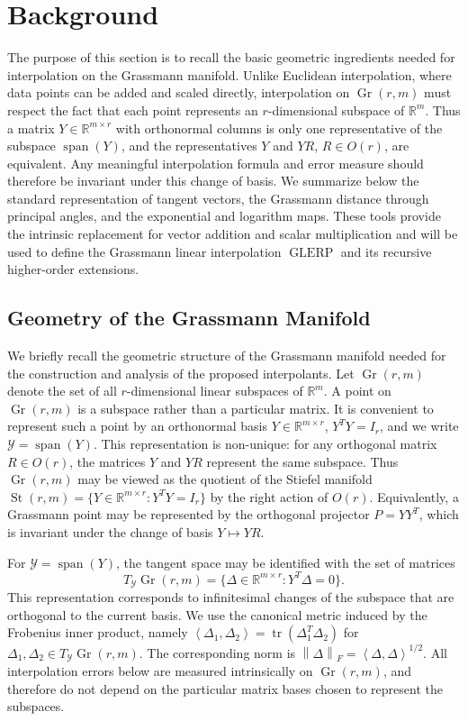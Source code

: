 \documentclass[a4paper,11pt]{article}
\newcommand{\bR}{\mathbb{R}}
\DeclareMathOperator{\Gr}{Gr}
\DeclareMathOperator{\St}{St}
\DeclareMathOperator{\spanop}{span}
\DeclareMathOperator{\tr}{tr}
\newcommand{\cY}{\mathcal{Y}}
\newcommand{\norm}[1]{\left\lVert #1 \right\rVert}
\newcommand{\inner}[2]{\left\langle #1,#2 \right\rangle}
\newcommand{\GLERP}{\operatorname{GLERP}}
\numberwithin{equation}{section}
\theoremstyle{plain}
\theoremstyle{definition}
\theoremstyle{remark}
\begin{document}
\section{Background}\label{sec:background}

The purpose of this section is to recall the basic geometric ingredients needed for interpolation on the Grassmann manifold.  Unlike Euclidean interpolation, where data points can be added and scaled directly, interpolation on \(\Gr(r,m)\) must respect the fact that each point represents an \(r\)-dimensional subspace of \(\bR^m\).  Thus a matrix \(Y\in\bR^{m\times r}\) with orthonormal columns is only one representative of the subspace \(\spanop(Y)\), and the representatives \(Y\) and \(YR\), \(R\in O(r)\), are equivalent.  Any meaningful interpolation formula and error measure should therefore be invariant under this change of basis.  We summarize below the standard representation of tangent vectors, the Grassmann distance through principal angles, and the exponential and logarithm maps.  These tools provide the intrinsic replacement for vector addition and scalar multiplication and will be used to define the Grassmann linear interpolation \(\GLERP\) and its recursive higher-order extensions.

\subsection{Geometry of the Grassmann Manifold}\label{sec:grassmann}

We briefly recall the geometric structure of the Grassmann manifold needed for the construction and analysis of the proposed interpolants. Let \(\Gr(r,m)\) denote the set of all \(r\)-dimensional linear subspaces of \(\bR^m\). A point on \(\Gr(r,m)\) is a subspace rather than a particular matrix. It is convenient to represent such a point by an orthonormal basis \(Y\in\bR^{m\times r}\), \(Y^T Y=I_r\), and we write \(\cY=\spanop(Y)\). This representation is non-unique: for any orthogonal matrix \(R\in O(r)\), the matrices \(Y\) and \(YR\) represent the same subspace. Thus \(\Gr(r,m)\) may be viewed as the quotient of the Stiefel manifold \(\St(r,m)=\{Y\in\bR^{m\times r}:Y^TY=I_r\}\) by the right action of \(O(r)\). Equivalently, a Grassmann point may be represented by the orthogonal projector \(P=YY^T\), which is invariant under the change of basis \(Y\mapsto YR\).

For \(\cY=\spanop(Y)\), the tangent space may be identified with the set of matrices
\[
    T_{\cY}\Gr(r,m)=\{\Delta\in\bR^{m\times r}:Y^T\Delta=0\}.
\]
This representation corresponds to infinitesimal changes of the subspace that are orthogonal to the current basis. We use the canonical metric induced by the Frobenius inner product, namely \(\inner{\Delta_1}{\Delta_2}=\tr(\Delta_1^T\Delta_2)\) for \(\Delta_1,\Delta_2\in T_{\cY}\Gr(r,m)\). The corresponding norm is \(\norm{\Delta}_F=\inner{\Delta}{\Delta}^{1/2}\). All interpolation errors below are measured intrinsically on \(\Gr(r,m)\), and therefore do not depend on the particular matrix bases chosen to represent the subspaces.
\end{document}
